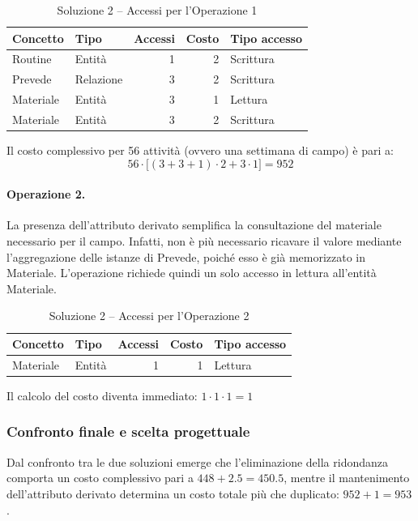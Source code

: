 \documentclass[11pt,a4paper]{article}
\begin{document}
\begin{table}[h]
\centering
\caption{Soluzione 2 -- Accessi per l'Operazione 1}
\label{tab:sol2-op1}
\begin{tabular}{@{}llrrl@{}}
\toprule
\textbf{Concetto} & \textbf{Tipo} & \textbf{Accessi} & \textbf{Costo} & \textbf{Tipo accesso} \\
\midrule
Routine   & Entità    & 1 & 2 & Scrittura \\
Prevede   & Relazione & 3 & 2 & Scrittura \\
Materiale & Entità    & 3 & 1 & Lettura \\
Materiale & Entità    & 3 & 2 & Scrittura \\
\bottomrule
\end{tabular}
\end{table}

Il costo complessivo per 56 attività (ovvero una settimana di campo) è pari a:
\[
56 \cdot \big[(3+3+1)\cdot 2 + 3 \cdot 1\big] = 952
\]

\paragraph{Operazione 2.}
La presenza dell'attributo derivato semplifica la consultazione del materiale necessario per il
campo. Infatti, non è più necessario ricavare il valore mediante l'aggregazione delle istanze di
Prevede, poiché esso è già memorizzato in Materiale. L'operazione richiede quindi un solo
accesso in lettura all'entità Materiale.

\begin{table}[h]
\centering
\caption{Soluzione 2 -- Accessi per l'Operazione 2}
\label{tab:sol2-op2}
\begin{tabular}{@{}llrrl@{}}
\toprule
\textbf{Concetto} & \textbf{Tipo} & \textbf{Accessi} & \textbf{Costo} & \textbf{Tipo accesso} \\
\midrule
Materiale & Entità & 1 & 1 & Lettura \\
\bottomrule
\end{tabular}
\end{table}

Il calcolo del costo diventa immediato: $1 \cdot 1 \cdot 1 = 1$

\subsubsection{Confronto finale e scelta progettuale}

Dal confronto tra le due soluzioni emerge che l'eliminazione della ridondanza comporta un costo
complessivo pari a $448 + 2.5 = 450.5$, mentre il mantenimento dell'attributo derivato determina
un costo totale più che duplicato: $952 + 1 = 953$.
\end{document}
